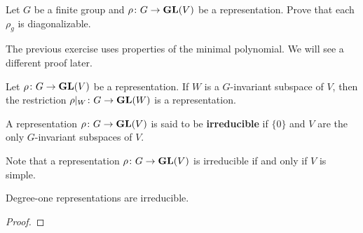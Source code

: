 \begin{exercise}
    Let $G$ be a finite group and 
    $\rho\colon G\to\mathbf{GL}(V)$ be a representation. Prove that 
    each $\rho_g$ is diagonalizable. 
\end{exercise}

The previous exercise uses properties of the minimal polynomial. We will 
see a different proof later. 

\begin{example}
\end{example}

\begin{definition}

\end{definition}

\begin{definition}

\end{definition}

Let $\rho\colon G\to\mathbf{GL}(V)$ be a representation. 
If $W$ is a $G$-invariant subspace of $V$, 
then the restriction $\rho|_W\colon G\to\mathbf{GL}(W)$
is a representation. 

\begin{definition}
    A representation $\rho\colon G\to\mathbf{GL}(V)$ is 
    said to be \textbf{irreducible} if 
    $\{0\}$ and $V$ are the only 
    $G$-invariant subspaces of $V$. 
\end{definition}

Note that a representation $\rho\colon G\to\mathbf{GL}(V)$ is irreducible
if and only if $V$ is simple. 

\begin{example}
    Degree-one representations are irreducible. 
\end{example}

\begin{example}

\end{example}

\begin{proposition}
\end{proposition}

\begin{proof}
\end{proof}

\begin{example}

\end{example}
